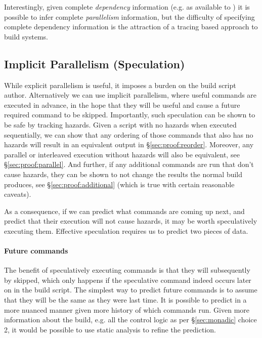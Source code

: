Interestingly, given complete \emph{dependency} information (e.g. as available to \Make) it is possible to infer complete \emph{parallelism} information, but the difficulty of specifying complete dependency information is the attraction of a tracing based approach to build systems.

\subsection{Implicit Parallelism (Speculation)}
\label{sec:speculation}

While explicit parallelism is useful, it imposes a burden on the build script author. Alternatively we can use implicit parallelism, where useful commands are executed in advance, in the hope that they will be useful and cause a future required command to be skipped. Importantly, such speculation can be shown to be safe by tracking hazards. Given a script with no hazards when executed sequentially, we can show that any ordering of those commands that also has no hazards will result in an equivalent output in \S\ref{sec:proof:reorder}. Moreover, any parallel or interleaved execution without hazards will also be equivalent, see \S\ref{sec:proof:parallel}. And further, if any additional commands are run that don't cause hazards, they can be shown to not change the results the normal build produces, see \S\ref{sec:proof:additional} (which is true with certain reasonable caveats).

As a consequence, if we can predict what commands are coming up next, and predict that their execution will not cause hazards, it may be worth speculatively executing them. Effective speculation requires us to predict two pieces of data.

\paragraph{Future commands} The benefit of speculatively executing commands is that they will subsequently by skipped, which only happens if the speculative command indeed occurs later on in the build script. The simplest way to predict future commands is to assume that they will be the same as they were last time. It is possible to predict in a more nuanced manner given more history of which commands run. Given more information about the build, e.g. all the control logic as per \S\ref{sec:monadic} choice 2, it would be possible to use static analysis to refine the prediction.

